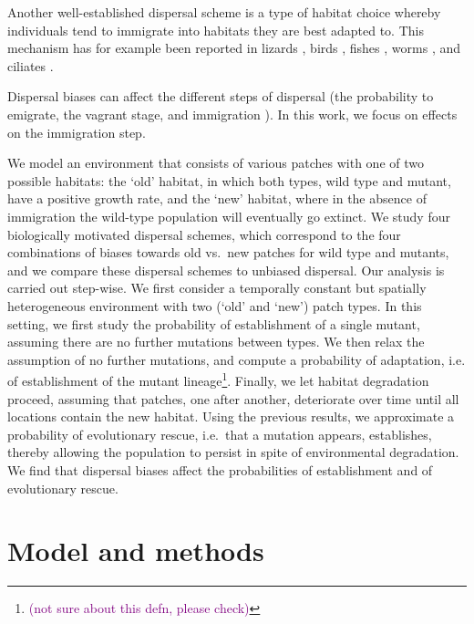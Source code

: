 \documentclass[11pt]{article}
\newcommand{\florence}[1]{\textcolor{purple}{(#1)}} %
\begin{document}
Another well-established dispersal scheme is a type of habitat choice whereby individuals tend to immigrate into habitats they are best adapted to. This mechanism has for example been reported in lizards \citep{bestion_2015}, birds \citep{dreiss_2011,benkman_2017}, fishes \citep{bolnick_2009}, worms \citep{mathieu_2010}, and ciliates \citep{jacob_2017,jacob_2018}. 

 Dispersal biases can affect the different steps of dispersal (the probability to emigrate, the vagrant stage, and immigration \citep{bowler_2005,ronce_2007}). In this work, we focus on effects on the immigration step. 

We model an environment that consists of various patches with one of two possible habitats: the `old' habitat, in which both types, wild type and mutant, have a positive growth rate, and the `new' habitat, where in the absence of immigration the wild-type population will eventually go extinct. We study four biologically motivated dispersal schemes, which correspond to the four combinations of biases towards old vs.\ new patches for wild type and mutants, and we compare these dispersal schemes to unbiased dispersal. Our analysis is carried out step-wise. We first consider a temporally constant but spatially heterogeneous environment with two (`old' and `new') patch types. In this setting, we first study the probability of establishment of a single mutant, assuming there are no further mutations between types. We then relax the assumption of no further mutations, and compute a probability of adaptation, i.e. of establishment of the mutant lineage\footnote{\florence{not sure about this defn, please check}}. Finally, we let habitat degradation proceed, assuming that patches, one after another, deteriorate over time until all locations contain the new habitat. Using the previous results, we approximate a probability of evolutionary rescue, i.e.\ that a mutation appears, establishes, thereby allowing the population to persist in spite of environmental degradation. We find that dispersal biases affect the probabilities of establishment and of evolutionary rescue. 

\section*{Model and methods}
\end{document}

